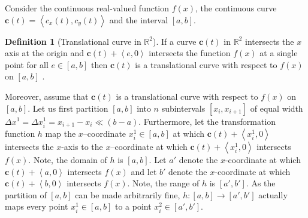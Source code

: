 \documentclass{article}
\theoremstyle{theorem}
\theoremstyle{definition}
\newtheorem*{definition}{Definition}
\begin{document}

\noindent
Consider the continuous real-valued function $f(x)$, the continuous curve $\mathbf{c}(t)=\left <c_x(t),c_y(t) \right >$ and the interval $[a,b]$.

\begin{definition}[Translational curve in $\mathbb{R}^2$]
If a curve $\mathbf{c}(t)$ in $\mathbb{R}^2$ intersects the $x$ axis at the origin and $\mathbf{c}(t) + \left < e,0 \right >$ intersects 
the function $f(x)$ at a single point for all $e\in [a,b]$ then $\mathbf{c}(t)$ is a translational curve 
with respect to $f(x)$ on $[a,b]$ \cite{ackermann12}. 
\end{definition}

\noindent
Moreover, assume that $\mathbf{c}(t)$ is a translational curve with respect to $f(x)$ on $[a,b]$. Let us first partition $[a,b]$ into $n$ subintervals $[x_{i},x_{i+1}]$ of equal 
width $\Delta x^1 = \Delta x_i^1 = x_{i+1}-x_i\ll (b-a)$. Furthermore, let the transformation function $h$ map the $x$--coordinate $x_i^1\in [a,b]$ at which $\mathbf{c}(t) + \left <x_i^1,0 \right >$ intersects the 
$x$-axis to the $x$--coordinate at which $\mathbf{c}(t) + \left <x_i^1,0 \right >$ intersects $f(x)$. Note, the domain of $h$ is $[a,b]$. Let $a'$ denote the $x$-coordinate 
at which $\mathbf{c}(t) + \left <a,0 \right >$ intersects $f(x)$ and let $b'$ denote the $x$-coordinate 
at which $\mathbf{c}(t) + \left <b,0 \right >$ intersects $f(x)$.  Note, the range 
of $h$ is $[a',b']$. As the partition of $[a,b]$ can be made arbitrarily fine, $h:[a,b]\rightarrow [a',b']$ actually maps every point $x_i^1\in [a,b]$ to a point $x_i^2\in [a',b']$. \\
\end{document}

